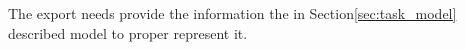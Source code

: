 The export needs provide the information the in Section\ref{sec:task_model} described model to proper represent it.








